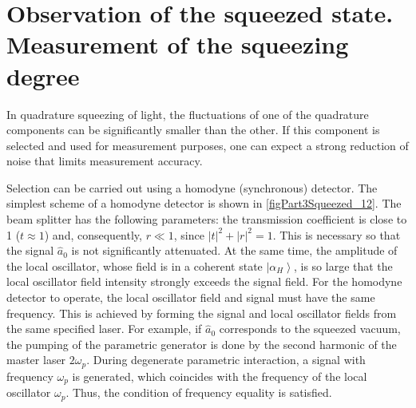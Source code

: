 \section{Observation of the squeezed state. Measurement of the squeezing degree}

In quadrature squeezing of light, the fluctuations of one of the quadrature
components can be significantly smaller than the other. If this
component is selected and used for measurement purposes, one can expect
a strong reduction of noise that limits measurement accuracy.



Selection can be carried out using a homodyne (synchronous)
detector. The simplest scheme of a homodyne detector is shown in
\autoref{figPart3Squeezed_12}. The beam splitter has the following
parameters: the transmission coefficient is close to 1 ($t \approx 1$) and,
consequently, $r \ll 1$, since $\left|t\right|^2 +\left|r\right|^2 =
1$. This is necessary so that the signal $\hat{a}_0$ is not significantly
attenuated. At the same time, the amplitude of the local oscillator, whose field is in
a coherent state $\left|\alpha_{H}\right>$, is so large that the local oscillator field intensity strongly exceeds the signal field. For the
homodyne detector to operate, the local oscillator field and signal
must have the same frequency. This is achieved by forming the signal and
local oscillator fields from the same specified laser. For example, if
$\hat{a}_0$ corresponds to the squeezed vacuum, the pumping of the parametric
generator is done by the second harmonic of the master laser $2
\omega_p$. During degenerate parametric interaction, a
signal with frequency $\omega_p$ is generated, which coincides with the frequency of the local oscillator
$\omega_p$. Thus, the condition of frequency equality is satisfied.

